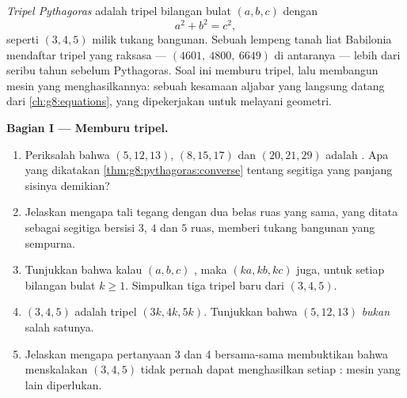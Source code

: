 \begin{problem}[{Soal akhir pekan --- segitiga siku-siku berbilangan
bulat, dan kesamaan $(m^2 - n^2)^2 + (2mn)^2 = (m^2 + n^2)^2$ yang
membangkitkan semuanya}]
\label{pb:g8:pythagoras:1}
\emph{Tripel Pythagoras} adalah tripel
bilangan bulat $(a, b, c)$ dengan
\[
a^2 + b^2 = c^2 ,
\]
seperti $(3, 4, 5)$ milik tukang bangunan. Sebuah lempeng tanah liat
Babilonia mendaftar tripel yang raksasa --- $(4601,\ 4800,\ 6649)$ di
antaranya --- lebih dari seribu tahun sebelum Pythagoras. Soal ini
memburu tripel, lalu membangun mesin yang menghasilkannya: sebuah
kesamaan aljabar yang langsung datang dari \cref{ch:g8:equations},
yang dipekerjakan untuk melayani geometri.

\medskip
\noindent\textbf{Bagian I --- Memburu tripel.}
\begin{enumerate}
  \item Periksalah bahwa $(5, 12, 13)$, $(8, 15, 17)$ dan
        $(20, 21, 29)$ adalah . Apa yang dikatakan
        \cref{thm:g8:pythagoras:converse} tentang segitiga yang
        panjang sisinya demikian?
  \item Jelaskan mengapa tali tegang dengan dua belas ruas yang sama,
        yang ditata sebagai segitiga bersisi $3$, $4$ dan $5$ ruas,
        memberi tukang bangunan  yang sempurna.
  \item Tunjukkan bahwa kalau $(a, b, c)$ , maka
        $(ka, kb, kc)$ juga, untuk setiap bilangan bulat $k \geq 1$.
        Simpulkan tiga tripel baru dari $(3, 4, 5)$.
  \item {} $(3, 4, 5)$ adalah tripel
        $(3k, 4k, 5k)$. Tunjukkan bahwa $(5, 12, 13)$ \emph{bukan}
        salah satunya.
  \item Jelaskan mengapa pertanyaan 3 dan 4 bersama-sama membuktikan
        bahwa menskalakan $(3, 4, 5)$ tidak pernah dapat menghasilkan
        setiap : mesin yang lain diperlukan.
\end{enumerate}


\end{problem}
